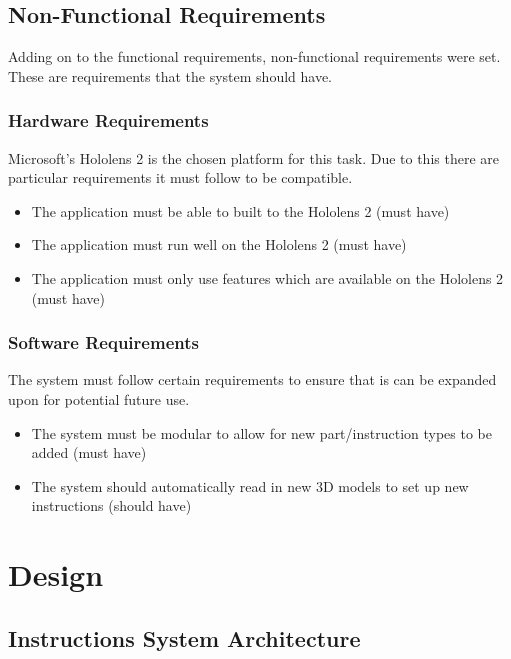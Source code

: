 \documentclass{l4proj}
\begin{document}
\section{Non-Functional Requirements}

Adding on to the functional requirements, non-functional requirements were set. These are requirements that the system should have.

\subsection{Hardware Requirements}

Microsoft's Hololens 2 is the chosen platform for this task. Due to this there are particular requirements it must follow to be compatible. 

\begin{itemize}
    \item The application must be able to built to the Hololens 2 (must have)
    \item The application must run well on the Hololens 2 (must have)
    \item The application must only use features which are available on the Hololens 2 (must have)
\end{itemize}

\subsection{Software Requirements}

The system must follow certain requirements to ensure that is can be expanded upon for potential future use.

\begin{itemize}
    \item The system must be modular to allow for new part/instruction types to be added (must have)
    \item The system should automatically read in new 3D models to set up new instructions (should have)
\end{itemize}

\chapter{Design}
\label{chap:design}

\section{Instructions System Architecture}
\end{document}
